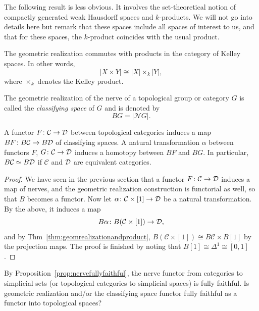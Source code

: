 \documentclass[a4paper,openany]{scrbook}
\renewcommand{\C}{\mathcal C}
\newcommand{\nerve}{\mathcal N}
\begin{document}
The following result is less obvious. It involves the set-theoretical notion of compactly generated weak Hausdorff spaces and $k$-products. We will not go into details here but remark that these spaces include all spaces of interest to us, and that for these spaces, the $k$-product coincides with the usual product. 
\begin{thm} \label{thm:geomrealizationandproduct}
The geometric realization commutes with products in the category of Kelley spaces. In other words,
\[
| X \times Y | \cong |X| \times_k |Y|,
\]
where $\times_k$ denotes the Kelley product.
\end{thm}

\begin{defn}
The geometric realization of the nerve of a topological group or category $G$ is called the \emph{classifying space} of $G$ and is denoted by
\[
BG = |\nerve G|.
\]
\end{defn}



\begin{lemma}\label{lemma:classifyinghomotopy}
A functor $F\colon \C \to \D$ between topological categories induces a map $BF\colon B\C \to B\D$ of classifying spaces. A natural transformation $\alpha$ between functors $F$, $G\colon \C \to \D$ induces a homotopy between $BF$ and $BG$. In particular, $B\C \simeq B\D$ if $\C$ and $\mathcal D$ are equivalent categories.
\end{lemma}
\begin{proof}
We have seen in the previous section that a functor $F\colon \C \to \D$ induces a map of nerves, and the geometric realization construction is functorial as well, so that $B$ becomes a functor. Now let $\alpha\colon \C \times [1] \to \D$ be a natural transformation. By the above, it induces a map
\[
B\alpha\colon B(\C \times [1]) \to \D,
\]
and by Thm~\ref{thm:geomrealizationandproduct}, $B(\C \times [1]) \cong B\C \times B[1]$ by the projection maps. The proof is finished by noting that $B[1] \cong \Delta^1 \cong [0,1]$.
\end{proof}

\begin{exer}
By Proposition~\ref{prop:nervefullyfaithful}, the nerve functor from categories to simplicial sets (or topological categories to simplicial spaces) is fully faithful. Is geometric realization and/or the classifying space functor fully faithful as a functor into topological spaces?
\end{exer}
\end{document}
